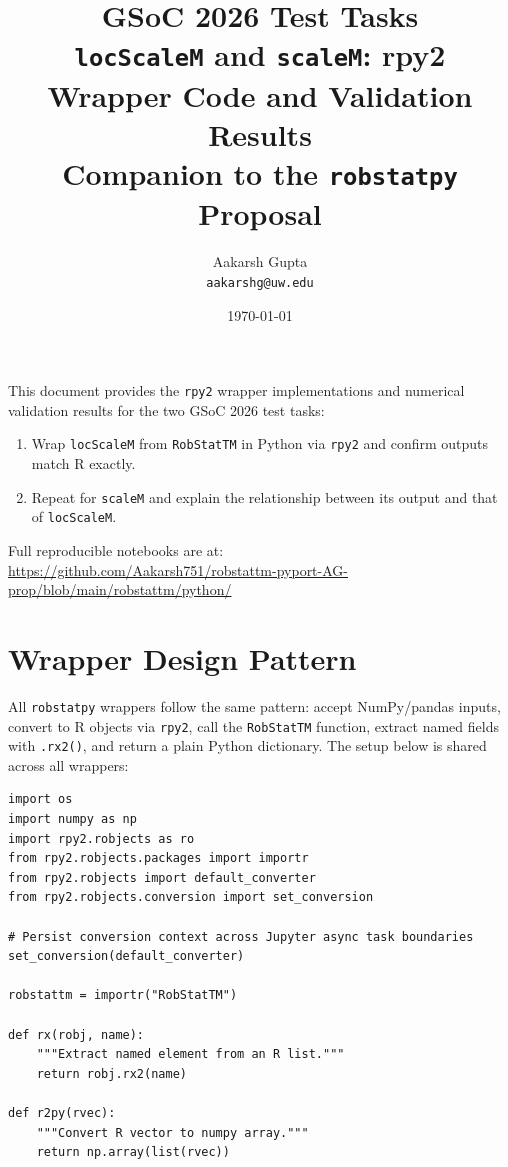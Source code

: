 \documentclass[11pt]{article}
\title{\textbf{GSoC 2026 Test Tasks}\\[6pt]
  \large\texttt{locScaleM} and \texttt{scaleM}:
  rpy2 Wrapper Code and Validation Results\\[4pt]
  \normalsize Companion to the \texttt{robstatpy} Proposal}
\author{Aakarsh Gupta \\ \texttt{aakarshg@uw.edu}}
\date{\today}
\begin{document}
\maketitle

\noindent
This document provides the \texttt{rpy2} wrapper implementations and
numerical validation results for the two GSoC 2026 test tasks:
\begin{enumerate}[leftmargin=2em]
  \item Wrap \texttt{locScaleM} from \texttt{RobStatTM} in Python via
    \texttt{rpy2} and confirm outputs match R exactly.
  \item Repeat for \texttt{scaleM} and explain the relationship between
    its output and that of \texttt{locScaleM}.
\end{enumerate}
Full reproducible notebooks are at:\\
\url{https://github.com/Aakarsh751/robstattm-pyport-AG-prop/blob/main/robstattm/python/}

\section{Wrapper Design Pattern}

All \texttt{robstatpy} wrappers follow the same pattern: accept
NumPy/pandas inputs, convert to R objects via \texttt{rpy2}, call the
\texttt{RobStatTM} function, extract named fields with \texttt{.rx2()},
and return a plain Python dictionary.
The setup below is shared across all wrappers:

\begin{lstlisting}[style=python, caption={Shared rpy2 setup for all robstatpy wrappers}]
import os
import numpy as np
import rpy2.robjects as ro
from rpy2.robjects.packages import importr
from rpy2.robjects import default_converter
from rpy2.robjects.conversion import set_conversion

# Persist conversion context across Jupyter async task boundaries
set_conversion(default_converter)

robstattm = importr("RobStatTM")

def rx(robj, name):
    """Extract named element from an R list."""
    return robj.rx2(name)

def r2py(rvec):
    """Convert R vector to numpy array."""
    return np.array(list(rvec))
\end{lstlisting}
\end{document}
